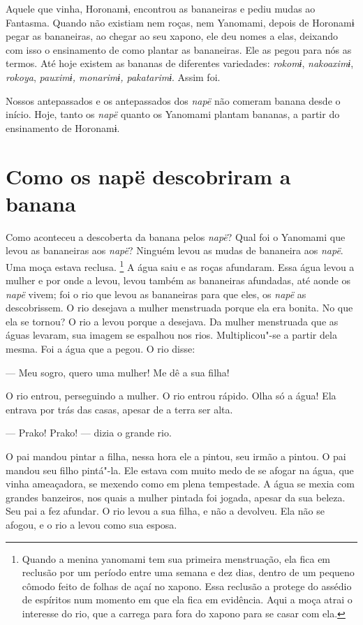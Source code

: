 Aquele que vinha, Horonamɨ, encontrou as bananeiras e pediu mudas ao
Fantasma. Quando não existiam nem roças, nem Yanomami, depois de
Horonamɨ pegar as bananeiras, ao chegar ao seu xapono, ele deu nomes a
elas, deixando com isso o ensinamento de como plantar as bananeiras. Ele
as pegou para nós as termos. Até hoje existem as bananas de diferentes
variedades: \emph{rokomɨ}, \emph{nakoaximɨ}, \emph{rokoya}, \emph{pauximɨ,
monarimɨ, pakatarimɨ}. Assim foi. 

Nossos antepassados e os antepassados dos \emph{napë} não comeram banana
desde o início. Hoje, tanto os \emph{napë} quanto os Yanomami plantam
bananas, a partir do ensinamento de Horonamɨ.

 
\section{Como os napë descobriram a banana}

Como aconteceu a descoberta da banana pelos \emph{napë}? Qual foi o
Yanomami que levou as bananeiras aos \emph{napë}? Ninguém levou as mudas
de bananeira aos \emph{napë}. Uma moça estava reclusa. \footnote{  Quando a menina yanomami tem sua primeira menstruação, ela fica em
reclusão por um período entre uma semana e dez dias, dentro de um
pequeno cômodo feito de folhas de açaí no xapono. Essa reclusão a
protege do assédio de espíritos num momento em que ela fica em
evidência. Aqui a moça atrai o interesse do rio, que a carrega para fora
do xapono para se casar com ela.} A água saiu
e as roças afundaram. Essa água levou a mulher e por onde a levou, levou
também as bananeiras afundadas, até aonde os \emph{napë} vivem; foi o
rio que levou as bananeiras para que eles, os \emph{napë} as
descobrissem. O rio desejava a mulher menstruada porque ela era bonita.
No que ela se tornou? O rio a levou porque a desejava. Da mulher
menstruada que as águas levaram, sua imagem se espalhou nos rios.
Multiplicou"-se a partir dela mesma. Foi a água que a pegou. O rio
disse: 

--- Meu sogro, quero uma mulher! Me dê a sua filha! 

O rio entrou, perseguindo a mulher. O rio entrou rápido. Olha só a água!
Ela entrava por trás das casas, apesar de a terra ser alta. 

--- Prako! Prako! --- dizia o grande rio. 

O pai mandou pintar a filha, nessa hora ele a pintou, seu irmão a
pintou. O pai mandou seu filho pintá"-la. Ele estava com muito medo de se
afogar na água, que vinha ameaçadora, se mexendo como em plena
tempestade. A água se mexia com grandes banzeiros, nos quais a mulher pintada foi
jogada, apesar da sua beleza. Seu pai a fez afundar. O rio levou a sua filha, e não a devolveu. Ela não se afogou, e o rio a
levou como sua esposa. 

